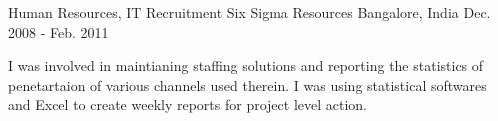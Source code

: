 

\begin{cventries}

  \cventry
    {Human Resources, IT Recruitment} %
    {Six Sigma Resources} %
    {Bangalore, India} %
    {Dec. 2008 - Feb. 2011} %
    {
      \begin{cvitems} %
        \item {I was involved in maintianing staffing solutions and reporting the statistics of penetartaion of various channels used therein. I was using statistical softwares and Excel to create weekly reports for project level action.}
      \end{cvitems}
    }

\end{cventries}
